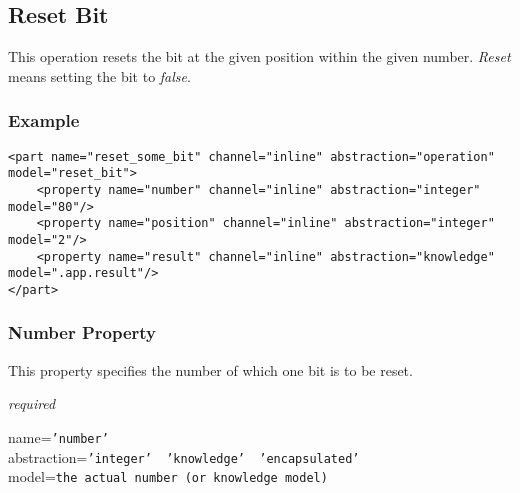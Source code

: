 %
%
%
%
%
%

\subsection{Reset Bit}
\label{reset_bit_heading}

This operation resets the bit at the given position within the given number.
\emph{Reset} means setting the bit to \emph{false}.

\subsubsection{Example}

\begin{scriptsize}
    \begin{verbatim}
<part name="reset_some_bit" channel="inline" abstraction="operation" model="reset_bit">
    <property name="number" channel="inline" abstraction="integer" model="80"/>
    <property name="position" channel="inline" abstraction="integer" model="2"/>
    <property name="result" channel="inline" abstraction="knowledge" model=".app.result"/>
</part>
    \end{verbatim}
\end{scriptsize}

\subsubsection{Number Property}

This property specifies the number of which one bit is to be reset.

\emph{required}

name=\texttt{'number'}\\
abstraction=\texttt{'integer' \vline\ 'knowledge' \vline\ 'encapsulated'}\\
model=\texttt{the actual number (or knowledge model)}

